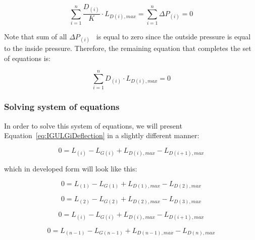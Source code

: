 \begin{equation}
\mathop \sum \limits_{i = 1}^n \frac{{{D_{\left( i \right)}}}}{K}\cdot {L_{D\left( i \right),max}} = \mathop \sum \limits_{i = 1}^n \Delta {P_{\left( i \right)}} = 0
\end{equation}

Note that sum of all \(\Delta {P_{\left( i \right)}}\) ~is equal to zero since the outside pressure is equal to the inside pressure. Therefore, the remaining equation that completes the set of equations is:

\begin{equation}
\mathop \sum \limits_{i = 1}^n {D_{\left( i \right)}}\cdot {L_{D\left( i \right),max}} = 0
\label{eq:IGUSumDiLDiEq0}
\end{equation}

\subsubsection{Solving system of equations}\label{solving-system-of-equations}

In order to solve this system of equations, we will present Equation~\ref{eq:IGULGiDeflection} in a slightly different manner:

\begin{equation}
0 = {L_{\left( i \right)}} - {L_{G\left( i \right)}} + {L_{D\left( i \right),max}} - {L_{D\left( {i + 1} \right),max}}
\end{equation}

which in developed form will look like this:

\begin{equation}
0 = {L_{\left( 1 \right)}} - {L_{G\left( 1 \right)}} + {L_{D\left( 1 \right),max}} - {L_{D\left( 2 \right),max}}
\end{equation}

\begin{equation}
0 = {L_{\left( 2 \right)}} - {L_{G\left( 2 \right)}} + {L_{D\left( 2 \right),max}} - {L_{D\left( 3 \right),max}}
\end{equation}

\begin{equation}
0 = {L_{\left( i \right)}} - {L_{G\left( i \right)}} + {L_{D\left( i \right),max}} - {L_{D\left( {i + 1} \right),max}}
\end{equation}

\begin{equation}
0 = {L_{\left( {n - 1} \right)}} - {L_{G\left( {n - 1} \right)}} + {L_{D\left( {n - 1} \right),max}} - {L_{D\left( n \right),max}}
\end{equation}

